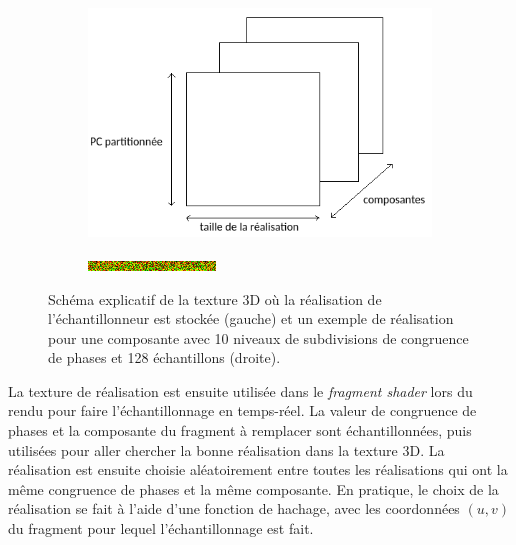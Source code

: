 \begin{figure}
    \centering
    \begin{subfigure}{.5\textwidth}
        \centering
        \includegraphics[width=\textwidth]{contenu/resources/images/sampler_realization}
    \end{subfigure}
    \hfill
    \begin{subfigure}{.45\textwidth}
        \centering
        \includegraphics[width=\textwidth]{contenu/resources/images/realization_pc_0}
    \end{subfigure}

    \caption[Réalisation de l'échantillonneur préférentiel]{Schéma explicatif de la texture 3D où la réalisation de l'échantillonneur est stockée (gauche) et un exemple de réalisation pour une composante avec 10 niveaux de subdivisions de congruence de phases et 128 échantillons (droite).}
    \label{fig:sampler-realization}
\end{figure}

La texture de réalisation est ensuite utilisée dans le \textit{fragment shader} lors du rendu pour faire l'échantillonnage en temps-réel. La valeur de congruence de phases et la composante du fragment à remplacer sont échantillonnées, puis utilisées pour aller chercher la bonne réalisation dans la texture 3D. La réalisation est ensuite choisie aléatoirement entre toutes les réalisations qui ont la même congruence de phases et la même composante. En pratique, le choix de la réalisation se fait à l'aide d'une fonction de hachage, avec les coordonnées $(u, v)$ du fragment pour lequel l'échantillonnage est fait.

